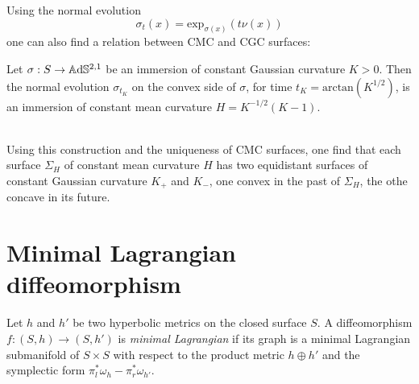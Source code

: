 Using the normal evolution
\[
    \sigma_t(x) = \text{exp}_{\sigma(x)} (t\nu(x))
\]
one can also find a relation between CMC and CGC surfaces:
\begin{proposition}
    Let $\sigma: S \to\mathbb{A}\mathrm{d}\mathbb{S}^{2,1}$ be an immersion of constant Gaussian curvature $K>0$. Then the normal evolution $\sigma_{t_K}$ on the convex side of $\sigma$, for time $t_K=\text{arctan}(K^{1/2})$, is an immersion of constant mean curvature $H=K^{-1/2}(K-1)$.
\end{proposition}
\\
Using this construction and the uniqueness of CMC surfaces, one find that each surface $\Sigma_H$ of constant mean curvature $H$ has two equidistant surfaces of constant Gaussian curvature $K_+$ and $K_-$, one convex in the past of $\Sigma_H$, the othe concave in its future.

\section{Minimal Lagrangian diffeomorphism}

\begin{definition}
    Let $h$ and $h'$ be two hyperbolic metrics on the closed surface $S$. A diffeomorphism $f: (S,h) \to (S,h')$ is \textit{minimal Lagrangian} if its graph is a minimal Lagrangian submanifold of $S\times S$ with respect to the product metric $h \oplus h'$ and the symplectic form $\pi_l^*\omega_h - \pi_r^* \omega_{h'}$. 
\end{definition}

